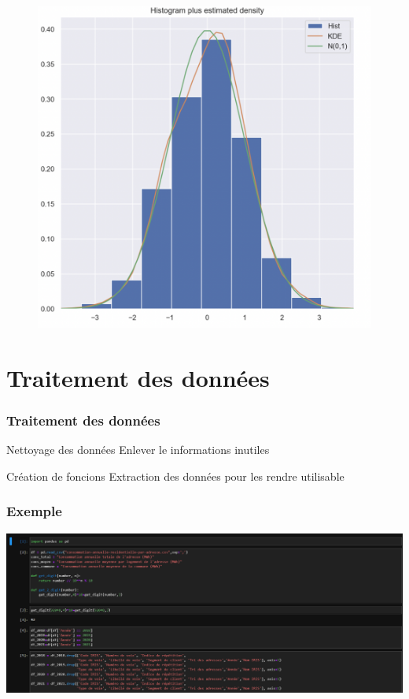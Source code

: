 \documentclass[compress, red]{beamer}
\begin{document}
\begin{frame}
\begin{figure}[h!]
\begin{minipage}[b]{0.4\linewidth}
		\centering \includegraphics[scale=0.3]{images/histogramme.png}
	\end{minipage}
\end{figure}
\end{frame}


\section{Traitement des données}

\begin{frame}
\frametitle{Traitement des données}


\begin{block}{Nettoyage des données}
Enlever le informations inutiles
\end{block}

\begin{block}{Création de foncions}
Extraction des données pour les rendre utilisable
\end{block}


\end{frame}


\begin{frame}
\frametitle{Exemple}
\includegraphics[scale=0.30]{images/Imagedonnee.png}

\end{frame}
\end{document}
